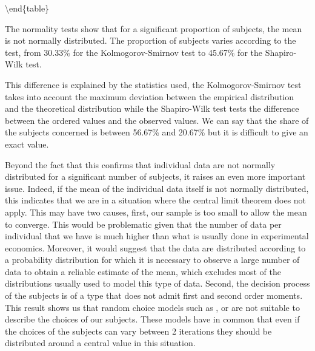 \documentclass[
]{book}
\begin{document}
\textbackslash end\{table\}

The normality tests show that for a significant proportion of subjects,
the mean is not normally distributed. The proportion of subjects varies
according to the test, from 30.33\%
for the Kolmogorov-Smirnov test to
45.67\% for the Shapiro-Wilk test.

This difference is explained by the statistics used, the
Kolmogorov-Smirnov test takes into account the maximum deviation between
the empirical distribution and the theoretical distribution while the
Shapiro-Wilk test tests the difference between the ordered values and
the observed values. We can say that the share of the subjects concerned
is between 56.67\% and
20.67\% but it is difficult to
give an exact value.

Beyond the fact that this confirms that individual data are not normally
distributed for a significant number of subjects, it raises an even more
important issue. Indeed, if the mean of the individual data itself is
not normally distributed, this indicates that we are in a situation
where the central limit theorem does not apply. This may have two
causes, first, our sample is too small to allow the mean to converge.
This would be problematic given that the number of data per individual
that we have is much higher than what is usually done in experimental
economics. Moreover, it would suggest that the data are distributed
according to a probability distribution for which it is necessary to
observe a large number of data to obtain a reliable estimate of the
mean, which excludes most of the distributions usually used to model
this type of data. Second, the decision process of the subjects is of a
type that does not admit first and second order moments.
This result shows us that random choice models such as \citet{gul2006random},
\citet{gul2014random} or \citet{cerreia2019deliberately} are not suitable to describe the
choices of our subjects.
These models have in common that even if the choices of the subjects can vary
between 2 iterations they should be distributed around a central value in this
situation.
\end{document}
